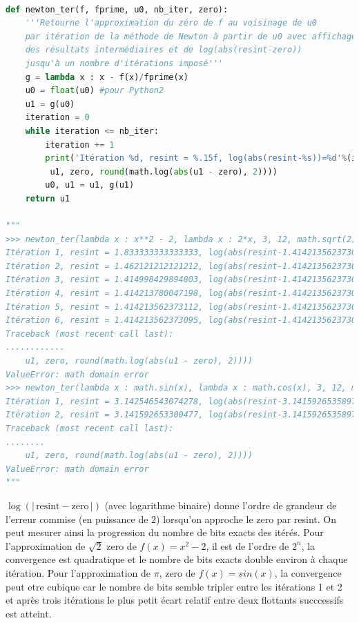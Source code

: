 \documentclass[
  11pt,
]{article}
\newcounter{thme}
\newcounter{def}
\newcounter{prog}
\begin{document}
\begin{lstlisting}[language=Python]

def newton_ter(f, fprime, u0, nb_iter, zero):
    '''Retourne l'approximation du zéro de f au voisinage de u0
    par itération de la méthode de Newton à partir de u0 avec affichage
    des résultats intermédiaires et de log(abs(resint-zero))
    jusqu'à un nombre d'itérations imposé'''
    g = lambda x : x - f(x)/fprime(x)
    u0 = float(u0) #pour Python2
    u1 = g(u0)
    iteration = 0
    while iteration <= nb_iter:
        iteration += 1 
        print('Itération %d, resint = %.15f, log(abs(resint-%s))=%d'%(iteration,
         u1, zero, round(math.log(abs(u1 - zero), 2))))
        u0, u1 = u1, g(u1)
    return u1

"""
>>> newton_ter(lambda x : x**2 - 2, lambda x : 2*x, 3, 12, math.sqrt(2))
Itération 1, resint = 1.833333333333333, log(abs(resint-1.4142135623730951))=-1
Itération 2, resint = 1.462121212121212, log(abs(resint-1.4142135623730951))=-4
Itération 3, resint = 1.414998429894803, log(abs(resint-1.4142135623730951))=-10
Itération 4, resint = 1.414213780047198, log(abs(resint-1.4142135623730951))=-22
Itération 5, resint = 1.414213562373112, log(abs(resint-1.4142135623730951))=-46
Itération 6, resint = 1.414213562373095, log(abs(resint-1.4142135623730951))=-52
Traceback (most recent call last):
............
    u1, zero, round(math.log(abs(u1 - zero), 2))))
ValueError: math domain error
>>> newton_ter(lambda x : math.sin(x), lambda x : math.cos(x), 3, 12, math.pi)
Itération 1, resint = 3.142546543074278, log(abs(resint-3.141592653589793))=-10
Itération 2, resint = 3.141592653300477, log(abs(resint-3.141592653589793))=-32
Traceback (most recent call last):
........
    u1, zero, round(math.log(abs(u1 - zero), 2))))
ValueError: math domain error
"""
\end{lstlisting}

\(\log(\vert \, \text{resint}-\text{zero} \, \vert)\) (avec logarithme
binaire) donne l'ordre de grandeur de l'erreur commise (en puissance de
\(2\)) lorsqu'on approche le zero par resint. On peut mesurer ainsi la
progression du nombre de bits exacts des itérés. Pour l'approximation de
\(\sqrt{2}\) zero de \(f(x)=x^2-2\), il est de l'ordre de \(2^{n}\), la
convergence est quadratique et le nombre de bits exacts double environ à
chaque itération. Pour l'approximation de \(\pi\), zero de
\(f(x)=sin(x)\), la convergence peut etre cubique car le nombre de bits
semble tripler entre les itérations 1 et 2 et après trois itérations le
plus petit écart relatif entre deux flottants succcessifs est atteint.
\end{document}

